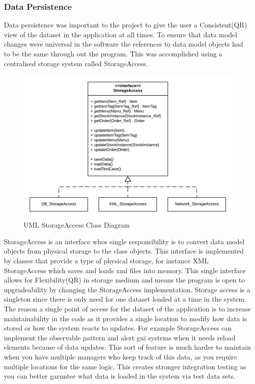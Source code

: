 \pagebreak

\subsubsection{Data Persistence}
Data persistence was important to the project to give the user a Consistent(QR) view of the dataset in the application at all times. To ensure that data model changes were universal in the software the references to data model objects had to be the same through out the program. This was accomplished using a centralised storage system called StorageAccess. 

\begin{figure}[h]
	\centering
	\includegraphics[width=.75\linewidth]{images/data_model/storage.png}
	\caption{UML StorageAccess Class Diagram}
\end{figure}

StorageAccess is an interface whos single responsibility is to convert data model objects from physical storage to the class objects. This interface is implemented by classes that provide a type of physical storage, for instance XML StorageAccess which saves and loads xml files into memory. This single interface allows for Flexibility(QR) in storage medium and means the program is open to upgradeability by changing the StorageAccess implementation. Storage access is a singleton since there is only need for one dataset loaded at a time in the system. The reason a single point of access for the dataset of the application is to increase maintainability in the code as it provides a single location to modify how data is stored or how the system reacts to updates. For example StorageAccess can implement the observable pattern and alert gui systems when it needs reload elements because of data updates. This sort of feature is much harder to maintain when you have multiple managers who keep track of this data, as you require multiple locations for the same logic. This creates stronger integration testing as you can better garuntee what data is loaded in the system via test data sets.

